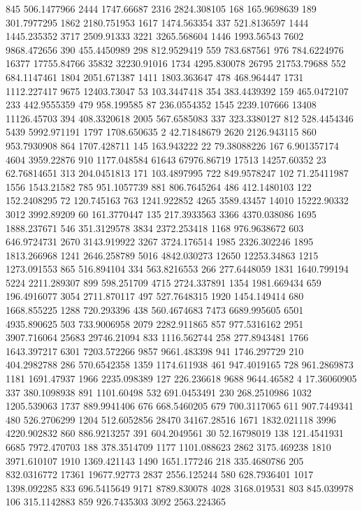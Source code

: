 845	506.1477966
2444	1747.66687
2316	2824.308105
168	165.9698639
189	301.7977295
1862	2180.751953
1617	1474.563354
337	521.8136597
1444	1445.235352
3717	2509.91333
3221	3265.568604
1446	1993.56543
7602	9868.472656
390	455.4450989
298	812.9529419
559	783.687561
976	784.6224976
16377	17755.84766
35832	32230.91016
1734	4295.830078
26795	21753.79688
552	684.1147461
1804	2051.671387
1411	1803.363647
478	468.964447
1731	1112.227417
9675	12403.73047
53	103.3447418
354	383.4439392
159	465.0472107
233	442.9555359
479	958.199585
87	236.0554352
1545	2239.107666
13408	11126.45703
394	408.3320618
2005	567.6585083
337	323.3380127
812	528.4454346
5439	5992.971191
1797	1708.650635
2	42.71848679
2620	2126.943115
860	953.7930908
864	1707.428711
145	163.943222
22	79.38088226
167	6.901357174
4604	3959.22876
910	1177.048584
61643	67976.86719
17513	14257.60352
23	62.76814651
313	204.0451813
171	103.4897995
722	849.9578247
102	71.25411987
1556	1543.21582
785	951.1057739
881	806.7645264
486	412.1480103
122	152.2408295
72	120.745163
763	1241.922852
4265	3589.43457
14010	15222.90332
3012	3992.89209
60	161.3770447
135	217.3933563
3366	4370.038086
1695	1888.237671
546	351.3129578
3834	2372.253418
1168	976.9638672
603	646.9724731
2670	3143.919922
3267	3724.176514
1985	2326.302246
1895	1813.266968
1241	2646.258789
5016	4842.030273
12650	12253.34863
1215	1273.091553
865	516.894104
334	563.8216553
266	277.6448059
1831	1640.799194
5224	2211.289307
899	598.251709
4715	2724.337891
1354	1981.669434
659	196.4916077
3054	2711.870117
497	527.7648315
1920	1454.149414
680	1668.855225
1288	720.293396
438	560.4674683
7473	6689.995605
6501	4935.890625
503	733.9006958
2079	2282.911865
857	977.5316162
2951	3907.716064
25683	29746.21094
833	1116.562744
258	277.8943481
1766	1643.397217
6301	7203.572266
9857	9661.483398
941	1746.297729
210	404.2982788
286	570.6542358
1359	1174.611938
461	947.4019165
728	961.2869873
1181	1691.47937
1966	2235.098389
127	226.236618
9688	9644.46582
4	17.36060905
337	380.1098938
891	1101.60498
532	691.0453491
230	268.2510986
1032	1205.539063
1737	889.9941406
676	668.5460205
679	700.3117065
611	907.7449341
480	526.2706299
1204	512.6052856
28470	34167.28516
1671	1832.021118
3996	4220.902832
860	886.9213257
391	604.2049561
30	52.16798019
138	121.4541931
6685	7972.470703
188	378.3514709
1177	1101.088623
2862	3175.469238
1810	3971.610107
1910	1369.421143
1490	1651.177246
218	335.4680786
205	832.0316772
17361	19677.92773
2837	2556.125244
580	628.7936401
1017	1398.092285
833	696.5415649
9171	8789.830078
4028	3168.019531
803	845.039978
106	315.1142883
859	926.7435303
3092	2563.224365
